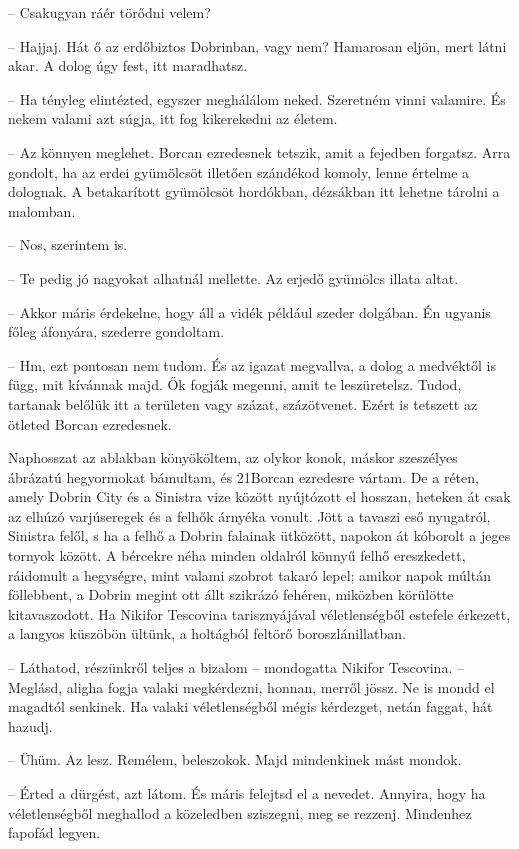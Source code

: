 \documentclass{IEEEtran}
\begin{document}
– Csakugyan ráér törődni velem?

– Hajjaj. Hát ő az erdőbiztos Dobrinban, vagy nem? Hamarosan eljön, mert látni
akar. A dolog úgy fest, itt maradhatsz.

– Ha tényleg elintézted, egyszer meghálálom neked. Szeretném vinni valamire.
És nekem valami azt súgja, itt fog kikerekedni az életem.

– Az könnyen meglehet. Borcan ezredesnek tetszik, amit a fejedben forgatsz.
Arra gondolt, ha az erdei gyümölcsöt illetően szándékod komoly, lenne értelme
a dolognak. A betakarított gyümölcsöt hordókban, dézsákban itt lehetne tárolni
a malomban.

– Nos, szerintem is.

– Te pedig jó nagyokat alhatnál mellette. Az erjedő gyümölcs illata altat.

– Akkor máris érdekelne, hogy áll a vidék például szeder dolgában. Én ugyanis
főleg áfonyára, szederre gondoltam.

– Hm, ezt pontosan nem tudom. És az igazat megvallva, a dolog a medvéktől is
függ, mit kívánnak majd. Ők fogják megenni, amit te leszüretelsz. Tudod,
tartanak belőlük itt a területen vagy százat, százötvenet. Ezért is tetszett
az ötleted Borcan ezredesnek.

Naphosszat az ablakban könyököltem, az olykor konok, máskor szeszélyes
ábrázatú hegyormokat bámultam, és 21Borcan ezredesre vártam. De a réten, amely
Dobrin City és a Sinistra vize között nyújtózott el hosszan, heteken át csak
az elhúzó varjúseregek és a felhők árnyéka vonult. Jött a tavaszi eső
nyugatról, Sinistra felől, s ha a felhő a Dobrin falainak ütközött, napokon át
kóborolt a jeges tornyok között. A bércekre néha minden oldalról könnyű felhő
ereszkedett, ráidomult a hegységre, mint valami szobrot takaró lepel; amikor
napok múltán föllebbent, a Dobrin megint ott állt szikrázó fehéren, miközben
körülötte kitavaszodott. Ha Nikifor Tescovina tarisznyájával véletlenségből
estefele érkezett, a langyos küszöbön ültünk, a holtágból feltörő
boroszlánillatban.

– Láthatod, részünkről teljes a bizalom – mondogatta Nikifor Tescovina. –
Meglásd, aligha fogja valaki megkérdezni, honnan, merről jössz. Ne is mondd el
magadtól senkinek. Ha valaki véletlenségből mégis kérdezget, netán faggat, hát
hazudj.

– Ühüm. Az lesz. Remélem, beleszokok. Majd mindenkinek mást mondok.

– Érted a dürgést, azt látom. És máris felejtsd el a nevedet. Annyira, hogy ha
véletlenségből meghallod a közeledben sziszegni, meg se rezzenj. Mindenhez
fapofád legyen.
\end{document}
